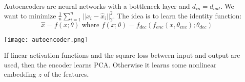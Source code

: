 Autoencoders are neural networks with a bottleneck layer and $d_{in} = d_{out}$. We want to minimize $\frac{1}{n}\sum_{i=1}^n ||x_i - \hat{x}_i||_2^2$. The idea is to learn the identity function:
$$\hat{x} = f(x; \theta) \text{ where } f(x; \theta) = f_{dec}(f_{enc}(x, \theta_{enc}); \theta_{dec})$$

\texttt{[image: autoencoder.png]}

If linear activation functions and the square loss between input and output are used, then the encoder learns PCA. Otherwise it learns some nonlinear embedding $z$ of the features.